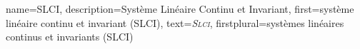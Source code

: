 {%
  name={SLCI},%
  description={Système Linéaire Continu et Invariant},%
  first={système\- lin\-éaire\- con\-tinu\- et\- in\-va\-riant\- (SLCI)},%
  text={\emph{{\scshape Slci}}},%
  firstplural={systèmes\- linéaires\- continus\- et\- invariants\- (SLCI)}%
}
